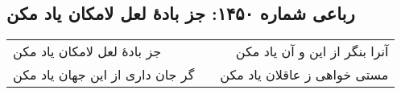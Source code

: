 \begin{center}
\section*{رباعی شماره ۱۴۵۰: جز بادهٔ لعل لامکان یاد مکن}
\label{sec:1450}
\begin{longtable}{l p{0.5cm} r}
جز بادهٔ لعل لامکان یاد مکن
&&
آنرا بنگر از این و آن یاد مکن
\\
گر جان داری از این جهان یاد مکن
&&
مستی خواهی ز عاقلان یاد مکن
\\
\end{longtable}
\end{center}
